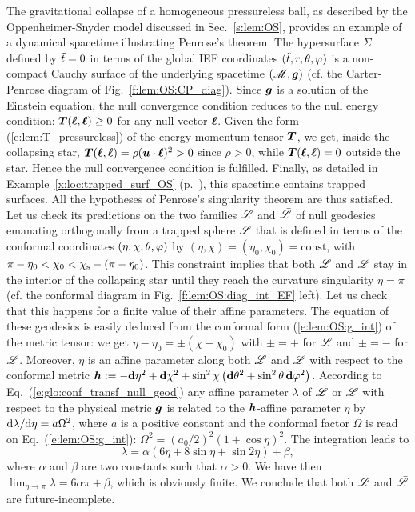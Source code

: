 \begin{example}
\label{x:loc:Penrose_thm_OS}
The gravitational collapse of a homogeneous pressureless ball, as
described by the Oppenheimer-Snyder model discussed in Sec.~\ref{s:lem:OS},
provides an example of a dynamical spacetime illustrating
Penrose's theorem.
The hypersurface $\Sigma$ defined by ${\tilde t}=0$ in terms of the global
IEF coordinates $({\tilde t}, r, \theta, \varphi)$ is a non-compact Cauchy surface of
the underlying spacetime $(\mathscr{M},\bm{g})$ (cf. the Carter-Penrose diagram
of Fig.~\ref{f:lem:OS:CP_diag}). Since $\bm{g}$ is a solution of the Einstein
equation, the null convergence condition reduces to the null energy condition:
$\bm{T}(\bm{\ell},\bm{\ell}) \geq 0$ for any null vector $\bm{\ell}$.  Given the form
(\ref{e:lem:T_pressureless}) of the energy-momentum tensor $\bm{T}$, we get,
inside the collapsing star,
$\bm{T}(\bm{\ell},\bm{\ell}) = \rho (\bm{u}\cdot\bm{\ell})^2 > 0$ since $\rho > 0$, while
$\bm{T}(\bm{\ell},\bm{\ell}) = 0$ outside the star. Hence the null convergence condition
is fulfilled. Finally, as detailed in Example~\ref{x:loc:trapped_surf_OS}
(p.~\pageref{x:loc:trapped_surf_OS}), this spacetime contains trapped surfaces.
All the hypotheses of Penrose's singularity theorem are thus satisfied.
Let us check its predictions on the two families $\mathscr{L}$ and $\bar{\mathscr{L}}$
of null geodesics emanating orthogonally from a trapped
sphere $\mathscr{S}$ that is defined in terms of the conformal coordinates
$(\eta,\chi,\theta,\varphi)$ by $(\eta,\chi) = (\eta_0,\chi_0) = \mathrm{const}$,
with
$\pi - \eta_0 < \chi_0 < \chi_{\rm s} - (\pi - \eta_0)$. This constraint implies
that both $\mathscr{L}$ and $\bar{\mathscr{L}}$
stay in the interior of the collapsing star until they reach
the curvature singularity $\eta=\pi$ (cf. the conformal diagram in
Fig.~\ref{f:lem:OS:diag_int_EF} left). Let us check that this happens for
a finite value of their affine parameters. The equation of these geodesics
is easily deduced from the conformal form (\ref{e:lem:OS:g_int}) of the metric tensor:
we get $\eta - \eta_0 = \pm (\chi - \chi_0)$ with $\pm = +$
for $\mathscr{L}$ and $\pm = -$ for $\bar{\mathscr{L}}$.
Moreover, $\eta$ is an affine parameter
along both $\mathscr{L}$ and $\bar{\mathscr{L}}$ with respect to the conformal metric
 $\bm{h} := - \mathbf{d}\eta^2 + \mathbf{d}\chi^2
        + \sin^2\chi \left( \mathbf{d}\theta^2 + \sin^2\theta\, \mathbf{d}\varphi^2 \right)$.
According to Eq.~(\ref{e:glo:conf_transf_null_geod}) any affine parameter $\lambda$
of $\mathscr{L}$ or $\bar{\mathscr{L}}$ with respect to the physical metric $\bm{g}$ is related
to the $\bm{h}$-affine parameter $\eta$ by $\mathrm{d}\lambda/\mathrm{d}\eta = a \Omega^2$, where $a$
is a positive constant and the
conformal factor $\Omega$ is read on Eq.~(\ref{e:lem:OS:g_int}):
$\Omega^2 = (a_0/2)^2 (1 + \cos\eta)^2$. The integration leads to
\[
    \lambda = \alpha \left( 6 \eta + 8 \sin\eta + \sin 2\eta \right) + \beta ,
\]
where $\alpha$ and $\beta$ are two constants such that $\alpha>0$. We have then
$\lim_{\eta\to\pi} \lambda = 6\alpha\pi + \beta$, which is obviously finite. We conclude that
both $\mathscr{L}$ and $\bar{\mathscr{L}}$ are future-incomplete.
\end{example}

